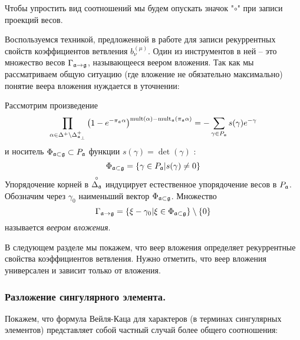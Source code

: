 Чтобы упростить вид соотношений мы будем опускать значок "$\circ$" при записи проекций весов.

Воспользуемся техникой, предложенной в работе  \cite{ilyin812pbc} для записи рекуррентных свойств коэффициентов ветвления $b_{\nu}^{(\mu )}$. Один из инструментов в ней -- это множество весов $\Gamma_{\mathfrak{a}\rightarrow \mathfrak{g}}$, называющееся веером вложения. Так как мы рассматриваем общую ситуацию (где вложение не обязательно максимально) понятие веера вложения нуждается в уточнении:
\begin{definition}
\label{fan-definition} Рассмотрим произведение
\begin{equation}
\prod_{\alpha \in \Delta ^{+}\setminus \Delta _{\afb }^{+}}\left( 1-e^{-\pi
_{\af}\alpha }\right) ^{\mathrm{mult}(\alpha )-\mathrm{mult}_{\af%
}(\pi _{\af}\alpha )}=-\sum_{\gamma \in P_{\af}}s(\gamma
)e^{-\gamma }  \label{eq:142}
\end{equation}
и носитель $\Phi _{\mathfrak{a}\subset \mathfrak{g}}\subset P_{\mathfrak{a}}$ функции $s(\gamma )=\det \left( \gamma \right) $ :
\begin{equation}
\Phi _{\mathfrak{a}\subset \mathfrak{g}}=\left\{ \gamma \in P_{\mathfrak{a}}|s(\gamma
)\neq 0\right\}   \label{eq:37}
\end{equation}
Упорядочение корней в  $\stackrel{\circ }{\Delta _{\mathfrak{a}}}$ индуцирует естественное упорядочение весов в $P_{\mathfrak{a}}$. Обозначим через $\gamma_{0}$ наименьший вектор $\Phi _{\mathfrak{a}\subset \mathfrak{g}}$. Множество
\begin{equation}
\Gamma _{\af\rightarrow \gf}=\left\{ \xi -\gamma _{0}|\xi \in \Phi _{%
\af\subset \gf}\right\} \setminus \left\{ 0\right\}
\label{fan-defined}
\end{equation}
называется  \textit{веером вложения}.
\end{definition}
В следующем разделе мы покажем, что веер вложения определяет рекуррентные свойства коэффициентов ветвления. Нужно отметить, что веер вложения универсален и зависит только от вложения. 

\subsubsection{Разложение сингулярного элемента.}
\label{subsec:decomp-sing-element}

Покажем, что формула Вейля-Каца для характеров (в терминах сингулярных элементов) представляет собой частный случай более общего соотношения:

